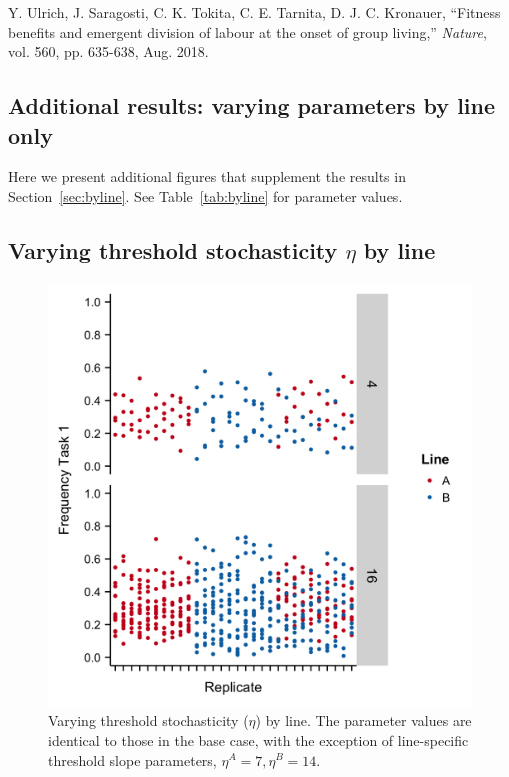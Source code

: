 \documentclass[11pt]{article}
\begin{document}
\begin{thebibliography}{99}

 Y. Ulrich, J. Saragosti, C. K. Tokita, C. E. Tarnita, D. J. C. Kronauer, ``Fitness benefits and emergent division of labour at the onset of group living,'' \textit{Nature}, vol. 560, pp. 635-638, Aug. 2018.

\end{thebibliography}

\begin{appendices}


\section{Additional results: varying parameters by line only}\vspace{-5pt}
Here we present additional figures that supplement the results in Section~\ref{sec:byline}. See Table~\ref{tab:byline} for parameter values.\vspace{-5pt}

\subsection{Varying threshold stochasticity $\eta$ by line}\vspace{-5pt}

\begin{figure}[H]
	\centering
	\includegraphics[width=.4\linewidth]{Diff_Etas_HighB.png}
	\caption{Varying threshold stochasticity ($\eta$) by line. The parameter values are identical to those in the base case, with the exception of line-specific threshold slope parameters, $\eta^A = 7, \eta^B = 14$.
	\vspace{-5pt}} 
	\label{fig:varyetaAB}
\end{figure}


\end{appendices}
\end{document}
